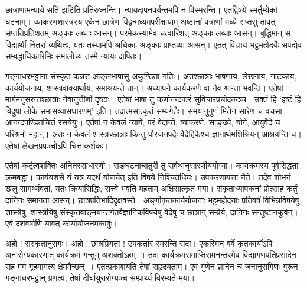 छात्राणामन्याये सति झटिति प्रतिरुध्नन्ति। न्यायदापनपर्यन्तमपि न विस्मरन्ति। एतद्विषये स्मर्तुम्येकां घटनाम्। व्याकरणशास्त्रस्य एकेन छात्रेण विद्वन्मध्यमपरीक्षायाम् अष्टानां पत्राणां मध्ये सप्तसु तावत् सप्ततिप्रतिशतम् अङ्काः लब्धाः आसन्। परमेकस्यामेव चत्वारिंशत् अङ्काः लब्धाः आसन्। बुद्धिमान् स विद्यार्थी नितरां व्यथितः, यतः तस्यामपि अधिकाः अङ्काः प्राप्तव्या आसन्। एतत् विज्ञाय भट्टमहोदयैः सपद्येव सम्बद्धाधिकारिभिः समालोच्य तस्मै न्यायः दापितः। 

गङ्गाधरभट्टानां संस्कृत-कन्नड-आङ्लभाषासु अकुण्ठिता गतिः। अतश्छात्राः भाषणाय, लेखनाय, नाटकाय, कार्ययोजनाय, शास्त्रवाक्यार्थाय, समाश्रयन्ते तान्। अध्यापने कार्यकरणे वा नैव श्रान्ता भवन्ति। एतेषां मार्गमनुसरन्तश्छात्राः नैवानुत्तीर्णा दृष्टाः। एतेषां भाषा तु कर्णानन्दकरं सुविचारप्रचोदकञ्च। उक्तं हि ‘इष्टं हि विदुषां लोके समासव्यासधारणम्’ इति। तदात्मसात्कृतं सम्यगेतैः। समयानुगुणं मितेन सारेण च वचसा आनन्दपण्डितचित्तं रसयेयुः। एतेषां न केवलं न्याये, परं वेदान्ते, व्याकरणे, साङ्ख्ये, योगे, आयुर्वेदे च परिश्रमो महान्। अतः न केवलं शास्त्रच्छात्राः किन्तु पौरजनपदैः वैदेहिकैश्च ज्ञानार्थमशिश्रियन् आश्रयन्ति च। एतेषां लेखनप्रपञ्चोऽपि चित्ताकर्शकः। 

एतेषां कर्तृत्वशक्तिः अनितरसाधारणी। सङ्घटनाचातुरी तु सर्वथानुसारणीययोग्या। कार्यक्रमस्य पूर्वसिद्धता क्रमबद्धा। कार्ययशसे यं यत्र यदर्थं योजयेत् इति विषये निश्चितधियः। उपकरणायत्ता नैते। तदेव शोभनं खलु सामर्थ्यवतां, यतः क्रियासिद्धिः, सत्त्वे भवति महताम् अक्षिसात्कृतं मया। संकृताध्यापकनां प्रोत्साहं कर्तुं दानिनः समागता आसन्। छात्रप्रतिभादिदृक्षवस्ते। अङ्गीकृतकार्ययोजनाः भट्टमहोदयाः प्रतिवर्षं विभिन्नविषयेषु शास्त्रेषु, शास्त्रीयेषु  संस्कृतवाङ्मयान्तर्गतवैज्ञानिकविषयेषु वेदेषु च छात्रान् सम्प्रेर्य, दानिनः सन्तुष्टानकुर्वन्। एवं दशवर्षाणि यावत् कार्यायोजनमकार्षुः। 

अहो ! संस्कृतानुरागः। अहो ! छात्रप्रियता ! उपकर्तारं स्मरन्ति सदा। एकस्मिन् वर्षे कृतकार्योऽपि अनारोग्यकारणात् कार्यक्रमं गन्तुम् अशक्तोऽहम्~। तदा कार्यक्रमसमाप्तिसमनन्तरमेव विद्यागणपतिप्रसादेन सह मम गृहमागत्य क्षेममैच्छन्~। एतत्प्रकाशयति तेषां सहृदयताम्। एवं गुणेन ज्ञानेन च जनानुरागिणः गुरून् गङ्गाधरभट्टान् प्रणत्य, तेषां दीर्घायुरारोग्यञ्च सम्प्रार्थ्य विरम्यते मया।  

\articleend
